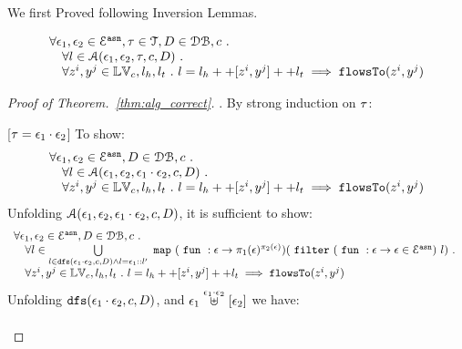 \documentclass[a4paper,11pt]{article}
\begin{document}
We first Proved following Inversion Lemmas.

\clearpage

\begin{thm}[Correctness]
\label{thm:alg_correct}
\[
\begin{array}{l}
  \forall \mathtt{\epsilon}_1, \mathtt{\epsilon}_2 \in \mathcal{E}^{\mathtt{{asn}}}, \mathtt{\tau} \in \mathcal{T}, D \in \mathcal{DB} , c ~.~
  \\ \quad 
   \forall l \in \mathcal{A}(\mathtt{\epsilon}_1, \mathtt{\epsilon}_2, \mathtt{\tau}, c, D) ~.~
   \\ \quad 
   \forall z^i, y^j \in \mathbb{LV}_c, l_h, l_t ~.~ 
   l = l_h ++ [z^i, y^j] ++ l_t 
   \implies \mathtt{flowsTo}(z^i, y^j)
\end{array}
\]
\end{thm}

\begin{proof}[Proof of Theorem.~\ref{thm:alg_correct}].
By strong induction on $\mathtt{\tau}$:
\begin{case}
\label{case:alg_correct_base}
[$\mathtt{\tau} = \mathtt{\epsilon}_1 \cdot \mathtt{\epsilon}_2$]
To show:
\[
\begin{array}{l}
  \forall \mathtt{\epsilon}_1, \mathtt{\epsilon}_2 \in \mathcal{E}^{\mathtt{{asn}}}, D \in \mathcal{DB} , c ~.~
  \\ \quad 
   \forall l \in \mathcal{A}( \mathtt{\epsilon}_1, \mathtt{\epsilon}_2,  \mathtt{\epsilon}_1 \cdot \mathtt{\epsilon}_2, c, D) ~.~
   \\ \quad 
   \forall z^i, y^j \in \mathbb{LV}_c, l_h, l_t ~.~ 
   l = l_h ++ [z^i, y^j] ++ l_t 
   \implies \mathtt{flowsTo}(z^i, y^j)
\end{array}
\]
%
Unfolding $\mathcal{A}(\mathtt{\epsilon}_1, \mathtt{\epsilon}_2, \mathtt{\epsilon}_1 \cdot \mathtt{\epsilon}_2, c, D)$, it is sufficient to show:
%
\[
\begin{array}{l}
  \forall \mathtt{\epsilon}_1, \mathtt{\epsilon}_2 \in \mathcal{E}^{\mathtt{{asn}}}, D \in \mathcal{DB} , c ~.~
  \\ \quad 
   \forall l \in  \bigcup\limits_{l \in \mathtt{dfs}(\mathtt{\epsilon}_1 \cdot \mathtt{\epsilon}_2, c, D) \land l = \mathtt{\epsilon}_1 :: l'}
  ~\mathtt{map}~ 
  (~\mathtt{fun}~ : \mathtt{\epsilon} \to \pi_1(\mathtt{\epsilon})^{\pi_2(\mathtt{\epsilon})})  
  (~\mathtt{filter}~ 
    (~\mathtt{fun}~ : \mathtt{\epsilon} \to  \mathtt{\epsilon} \in \mathcal{E}^{\mathtt{{asn}}}) ~ l)
 ~.~
   \\ \quad 
   \forall z^i, y^j \in \mathbb{LV}_c, l_h, l_t ~.~ 
   l = l_h ++ [z^i, y^j] ++ l_t 
   \implies \mathtt{flowsTo}(z^i, y^j)
\end{array}
\]
%
Unfolding $\mathtt{dfs}(\mathtt{\epsilon}_1 \cdot \mathtt{\epsilon}_2, c, D)$, and $\mathtt{\epsilon}_1 \stackrel{\mathtt{\epsilon}_1 \cdot \mathtt{\epsilon}_2}{\uplus} [\mathtt{\epsilon}_2] $ we have:
\[
\begin{array}{l}

\end{array}\]
\end{case}
\end{proof}
\end{document}
